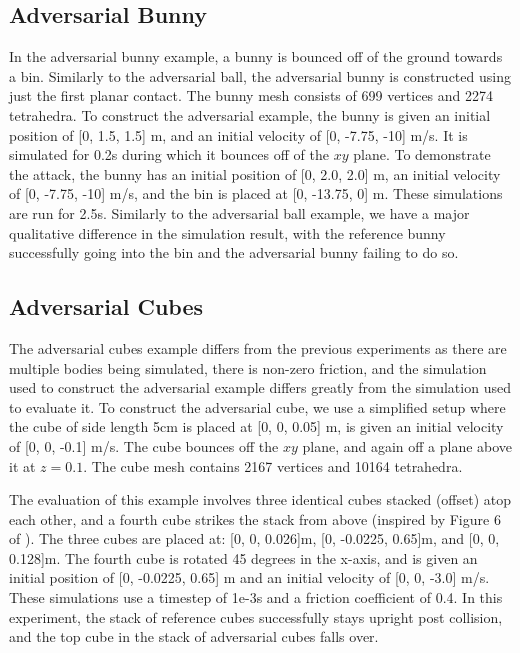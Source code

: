 \subsection{Adversarial Bunny}
In the adversarial bunny example, a bunny is bounced off of the ground towards a bin. Similarly to the adversarial ball, the adversarial bunny is constructed using just the first planar contact. The bunny mesh consists of 699 vertices and 2274 tetrahedra. To construct the adversarial example, the bunny is given an initial position of  [0, 1.5, 1.5] m, and an initial velocity of  [0, -7.75, -10] m/s. It is simulated for 0.2s during which it bounces off of the $xy$ plane. 
To demonstrate the attack, the bunny has an initial position of  [0, 2.0, 2.0] m, an initial velocity of  [0, -7.75, -10] m/s, and the bin is placed at [0, -13.75, 0] m. These simulations are run for 2.5s. Similarly to the adversarial ball example, we have a major qualitative difference in the simulation result, with the reference bunny successfully going into the bin and the adversarial bunny failing to do so.

\subsection{Adversarial Cubes}
The adversarial cubes example differs from the previous experiments as there are multiple bodies being simulated, there is non-zero friction, and the simulation used to construct the adversarial example differs greatly from the simulation used to evaluate it. To construct the adversarial cube, we use a simplified setup where the cube of side length 5cm is placed at [0, 0, 0.05] m, is given an initial velocity of [0, 0, -0.1] m/s. The cube bounces off the $xy$ plane, and again off a plane above it at $z = 0.1$. The cube mesh contains 2167 vertices and 10164 tetrahedra.

The evaluation of this example involves three identical cubes stacked (offset) atop each other, and a fourth cube strikes the stack from above (inspired by Figure 6 of \citet{backward-rigid-body}). The three cubes are placed at: [0, 0, 0.026]m,  [0, -0.0225, 0.65]m, and  [0, 0, 0.128]m. The fourth cube is rotated 45 degrees in the x-axis, and is given an initial position of [0, -0.0225, 0.65] m and an initial velocity of [0, 0, -3.0] m/s. These simulations use a timestep of 1e-3s and a friction coefficient of 0.4. In this experiment, the stack of reference cubes successfully stays upright post collision, and the top cube in the stack of adversarial cubes falls over.

